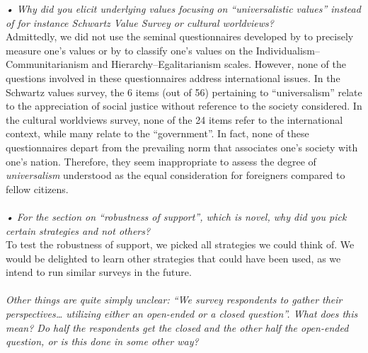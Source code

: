 \documentclass[12pt,english]{article}
\begin{document}

\textit{• Why did you elicit underlying values focusing on “universalistic values” instead of for instance Schwartz Value Survey or cultural worldviews?}~\\ 

Admittedly, we did not use the seminal questionnaires developed by \citet{schwartz_are_1994} to precisely measure one's values or by \citet{douglas_risk_1982} to classify one's values on the Individualism--Communitarianism and Hierarchy--Egalitarianism scales. However, none of the questions involved in these questionnaires address international issues. In the Schwartz values survey, the 6 items (out of 56) pertaining to ``universalism'' relate to the appreciation of social justice without reference to the society considered. In the cultural worldviews survey, none of the 24 items refer to the international context, while many relate to the ``government''. In fact, none of these questionnaires depart from the prevailing norm that associates one's society with one's nation. Therefore, they seem inappropriate to assess the degree of \textit{universalism} understood as the equal consideration for foreigners compared to fellow citizens. 
~\\ ~\\

\textit{• For the section on “robustness of support”, which is novel, why did you pick certain strategies and not others?}~\\

To test the robustness of support, we picked all strategies we could think of. We would be delighted to learn other strategies that could have been used, as we intend to run similar surveys in the future.
~\\ ~\\

\textit{Other things are quite simply unclear: “We survey respondents to gather their perspectives… utilizing either an open-ended or a closed question”. What does this mean? Do half the respondents get the closed and the other half the open-ended question, or is this done in some other way?}~\\
\end{document}
